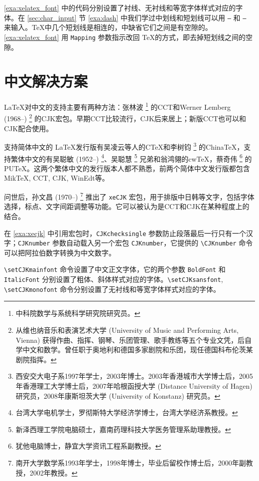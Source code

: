\autoref{exa:xelatex_font} 中的代码分别设置了衬线、无衬线和等宽字体样式对应的字体。在 \ref{sec:char_input} 节 \autoref{exa:dash} 中我们学过中划线和短划线可以用 \texttt{--} 和 \texttt{---} 来输入。\TeX 中几个短划线是相连的，\XeTeX 中缺省它们之间是有空隙的。\autoref{exa:xelatex_font} 用 \texttt{Mapping} 参数指示改回 \TeX 的方式，即去掉短划线之间的空隙。

\section{中文解决方案}

\LaTeX 对中文的支持主要有两种方法：张林波\indexZhangLinbo{} \footnote{中科院数学与系统科学研究院研究员。} 的CCT和Werner Lemberg (1968--)\indexLemberg{} \footnote{从维也纳音乐和表演艺术大学 (University of Music and Performing Arts, Vienna) 获得作曲、指挥、钢琴、乐团管理、歌手教练等五个专业文凭，后自学中文和数学。曾任职于奥地利和德国多家剧院和乐团，现任德国科布伦茨某剧院指挥。} 的CJK宏包。早期CCT比较流行，CJK后来居上；新版CCT也可以和CJK配合使用。

支持简体中文的 \LaTeX 发行版有吴凌云等人的CTeX和李树钧\indexLiShujun{} \footnote{西安交大电子系1997年学士，2003年博士。2003年香港城市大学博士后，2005年香港理工大学博士后，2007年哈根函授大学 (Distance University of Hagen) 研究员，2008年康斯坦茨大学 (University of Konstanz) 研究员。} 的ChinaTeX，支持繁体中文的有吴聪敏 (1952--)\indexWuCongmin{} \footnote{台湾大学电机学士，罗彻斯特大学经济学博士，台湾大学经济系教授。}、吴聪慧\indexWuConghui{} \footnote{新泽西理工学院电脑硕士，嘉南药理科技大学医务管理系助理教授。} 兄弟和翁鸿翎\indexWongHongling 的cwTeX，蔡奇伟\indexCaiQiwei{} \footnote{犹他电脑博士，静宜大学资讯工程系副教授。} 的PUTeX。这两个繁体中文的发行版本人都不熟悉，前两个简体中文发行版都包含MikTeX, CCT, CJK, WinEdt等。

\XeTeX 问世后，孙文昌 (1970--)\indexSunWenchang{} \footnote{南开大学数学系1993年学士，1998年博士，毕业后留校作博士后，2000年副教授，2002年教授。} 推出了 \texttt{xeCJK} 宏包，用于排版中日韩等文字，包括字体选择，标点、文字间距调整等功能。它可以被认为是CCT和CJK在某种程度上的结合。

在 \autoref{exa:xecjk} 中引用宏包时，\texttt{CJKchecksingle} 参数防止段落最后一行只有一个汉字；\texttt{CJKnumber} 参数自动载入另一个宏包 \texttt{CJKnumber}，它提供的 \verb|\CJKnumber| 命令可以把阿拉伯数字转换为中文数字。

\verb|\setCJKmainfont| 命令设置了中文正文字体，它的两个参数 \texttt{BoldFont} 和 \texttt{ItalicFont} 分别设置了粗体、斜体样式对应的字体。\verb|\setCJKsansfont|, \verb|\setCJKmonofont| 命令分别设置了无衬线和等宽字体样式对应的字体。

